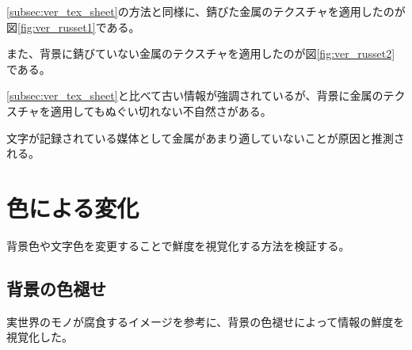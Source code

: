 \ref{subsec:ver_tex_sheet}の方法と同様に、錆びた金属のテクスチャを適用したのが図\ref{fig:ver_russet1}である。

また、背景に錆びていない金属のテクスチャを適用したのが図\ref{fig:ver_russet2}である。

\ref{subsec:ver_tex_sheet}と比べて古い情報が強調されているが、背景に金属のテクスチャを適用してもぬぐい切れない不自然さがある。

文字が記録されている媒体として金属があまり適していないことが原因と推測される。

\section{色による変化}
\label{sec:ver_color}

背景色や文字色を変更することで鮮度を視覚化する方法を検証する。

\subsection{背景の色褪せ}
\label{subsec:ver_col_cor}

実世界のモノが腐食するイメージを参考に、背景の色褪せによって情報の鮮度を視覚化した。

